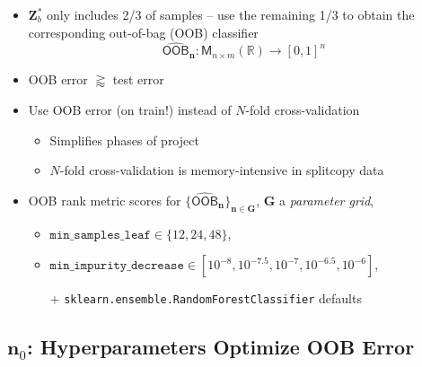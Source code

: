 \documentclass[handout]{beamer}
\begin{document}
\begin{frame}
 
\begin{itemize}
 \item $\mathbf{Z}^*_b$ only includes 2/3 of samples -- 
 use the remaining 1/3 to obtain the corresponding out-of-bag (OOB) classifier
 \begin{equation*}
 \operatorname{\widehat{\mathsf{OOB}}}_\mathbf{n} : \mathsf{M}_{n \times m} (\mathbb{R})  \rightarrow [0, 1]^n
\end{equation*}
 \vfill
 \item OOB error $\gtrapprox$ test error
  \vfill
 \item Use OOB error \alert{(on train!)} instead of $N$-fold cross-validation
 \begin{itemize}
 \item Simplifies phases of project
 \item $N$-fold cross-validation is memory-intensive in splitcopy data
 \end{itemize}
   \vfill
 \item OOB rank metric scores for $\{  \operatorname{\widehat{\mathsf{OOB}}}_\mathbf{n} \}_{\mathbf{n} \in \mathbf{G}}$,
$\mathbf{G}$ a \emph{parameter grid},
 \begin{itemize}
 \item $\mathtt{min\_samples\_leaf} \in \{12, 24, 48\}$,
\item $\mathtt{min\_impurity\_decrease} \in [10^{-8}, 10^{-7.5}, 10^{-7}, 10^{-6.5}, 10^{-6}]$,
\item[$+$] \texttt{sklearn.ensemble.RandomForestClassifier} defaults
\end{itemize}
 \end{itemize}

\end{frame}

\subsection{\(\mathbf{n}_0\): Hyperparameters Optimize OOB Error}
\end{document}
